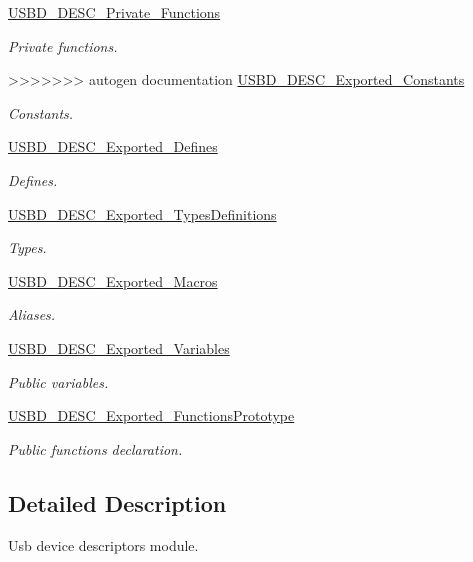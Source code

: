 \begin{DoxyCompactItemize}
\hyperlink{group___u_s_b_d___d_e_s_c___private___functions}{U\+S\+B\+D\+\_\+\+D\+E\+S\+C\+\_\+\+Private\+\_\+\+Functions}
\begin{DoxyCompactList}\small\item\em Private functions. \end{DoxyCompactList}\item 
>>>>>>> autogen documentation
\hyperlink{group___u_s_b_d___d_e_s_c___exported___constants}{U\+S\+B\+D\+\_\+\+D\+E\+S\+C\+\_\+\+Exported\+\_\+\+Constants}
\begin{DoxyCompactList}\small\item\em Constants. \end{DoxyCompactList}\item 
\hyperlink{group___u_s_b_d___d_e_s_c___exported___defines}{U\+S\+B\+D\+\_\+\+D\+E\+S\+C\+\_\+\+Exported\+\_\+\+Defines}
\begin{DoxyCompactList}\small\item\em Defines. \end{DoxyCompactList}\item 
\hyperlink{group___u_s_b_d___d_e_s_c___exported___types_definitions}{U\+S\+B\+D\+\_\+\+D\+E\+S\+C\+\_\+\+Exported\+\_\+\+Types\+Definitions}
\begin{DoxyCompactList}\small\item\em Types. \end{DoxyCompactList}\item 
\hyperlink{group___u_s_b_d___d_e_s_c___exported___macros}{U\+S\+B\+D\+\_\+\+D\+E\+S\+C\+\_\+\+Exported\+\_\+\+Macros}
\begin{DoxyCompactList}\small\item\em Aliases. \end{DoxyCompactList}\item 
\hyperlink{group___u_s_b_d___d_e_s_c___exported___variables}{U\+S\+B\+D\+\_\+\+D\+E\+S\+C\+\_\+\+Exported\+\_\+\+Variables}
\begin{DoxyCompactList}\small\item\em Public variables. \end{DoxyCompactList}\item 
\hyperlink{group___u_s_b_d___d_e_s_c___exported___functions_prototype}{U\+S\+B\+D\+\_\+\+D\+E\+S\+C\+\_\+\+Exported\+\_\+\+Functions\+Prototype}
\begin{DoxyCompactList}\small\item\em Public functions declaration. \end{DoxyCompactList}\end{DoxyCompactItemize}


\subsection{Detailed Description}
Usb device descriptors module. 

